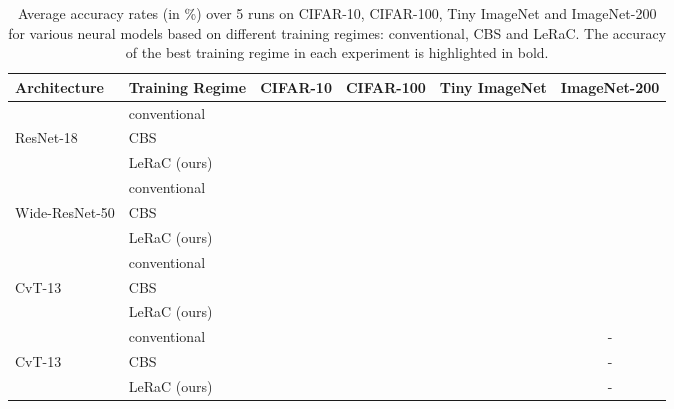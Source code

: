 \documentclass[10pt,twocolumn,letterpaper]{article}
\begin{document}
\begin{table*}[!th]
\small{
  \begin{center}
  \begin{tabular}{llcccc}
    \toprule
    Architecture       & Training Regime     & CIFAR-10  & CIFAR-100 & Tiny ImageNet & ImageNet-200\\
    \midrule      
             & conventional               &     &     &  &  \\
    ResNet-18          & CBS \cite{Sinha-NIPS-2020}             &     &     &  &  \\
             & LeRaC (ours)    &     &     &  & \\
    \midrule   
         & conventional               &     &     &  & \\
    Wide-ResNet-50     & CBS \cite{Sinha-NIPS-2020}             &     &     &  & \\
         & LeRaC (ours)    &     &     &  & \\
    \midrule    
                 & conventional               &     &     &  & \\
    CvT-13             & CBS \cite{Sinha-NIPS-2020}             &     &     &  & \\
                 & LeRaC (ours)    &     &     &  & \\
    \midrule
      & conventional               &     &     &  & - \\
    CvT-13  & CBS \cite{Sinha-NIPS-2020}             &     &     &  & - \\
     & LeRaC (ours)    &     &     &  & - \\
    \bottomrule
  \end{tabular}
  \end{center}
}
    \vspace{-0.6cm}
  \caption{Average accuracy rates (in \%) over 5 runs on CIFAR-10, CIFAR-100, Tiny ImageNet and ImageNet-200 for various neural models based on different training regimes: conventional, CBS \cite{Sinha-NIPS-2020} and LeRaC. The accuracy of the best training regime in each experiment is highlighted in bold.\vspace{-0.4cm}}\label{tab_vision}
\end{table*}
\end{document}
